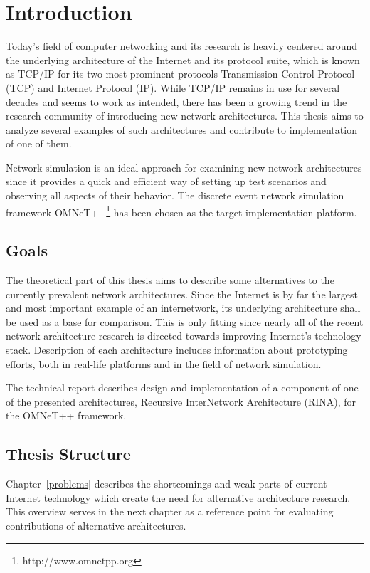 
\chapter{Introduction}\label{intro}

    Today's field of computer networking and its research is heavily centered around the underlying architecture of the Internet and its protocol suite, which is known as TCP/IP for its two most prominent protocols Transmission Control Protocol (TCP) and Internet Protocol (IP). While TCP/IP remains in use for several decades and seems to work as intended, there has been a growing trend in the research community of introducing new network architectures. This thesis aims to analyze several examples of such architectures and contribute to implementation of one of them.

    Network simulation is an ideal approach for examining new network architectures since it provides a quick and efficient way of setting up test scenarios and observing all aspects of their behavior. The discrete event network simulation framework OMNeT++\footnote{http://www.omnetpp.org} has been chosen as the target implementation platform.

    \section{Goals}

        The theoretical part of this thesis aims to describe some alternatives to the currently prevalent network architectures. Since the Internet is by far the largest and most important example of an internetwork, its underlying architecture shall be used as a base for comparison. This is only fitting since nearly all of the recent network architecture research is directed towards improving Internet's technology stack. Description of each architecture includes information about prototyping efforts, both in real-life platforms and in the field of network simulation.

        The technical report describes design and implementation of a component of one of the presented architectures, Recursive InterNetwork Architecture (RINA), for the OMNeT++ framework.

    \section{Thesis Structure}

        Chapter~\ref{problems} describes the shortcomings and weak parts of current Internet technology which create the need for alternative architecture research. This overview serves in the next chapter as a reference point for evaluating contributions of alternative architectures.

